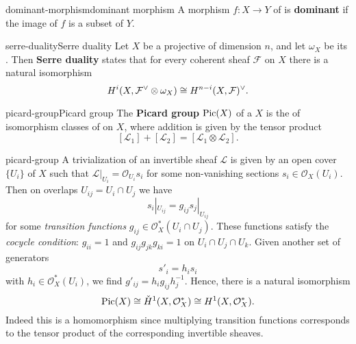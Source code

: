 \begin{topic}{dominant-morphism}{dominant morphism}
    A morphism $f : X \to Y$ of  is \textbf{dominant} if the image of $f$ is a  subset of $Y$.
\end{topic}

\begin{topic}{serre-duality}{Serre duality}
    Let $X$ be a  projective  of dimension $n$, and let $\omega_X$ be its . Then \textbf{Serre duality} states that for every coherent sheaf $\mathcal{F}$ on $X$ there is a natural isomorphism
    \[ H^i(X, \mathcal{F}^\vee \otimes \omega_X) \cong H^{n - i}(X, \mathcal{F})^\vee . \]
\end{topic}

\begin{topic}{picard-group}{Picard group}
    The \textbf{Picard group} $\textup{Pic}(X)$ of a  $X$ is the  of isomorphism classes of  on $X$, where addition is given by the tensor product
    \[ [\mathcal{L}_1] + [\mathcal{L}_2] = [\mathcal{L}_1 \otimes \mathcal{L}_2] . \]
\end{topic}

\begin{example}{picard-group}
    A trivialization of an invertible sheaf $\mathcal{L}$ is given by an open cover $\{ U_i \}$ of $X$ such that $\mathcal{L}|_{U_i} = \mathcal{O}_{U_i} s_i$ for some non-vanishing sections $s_i \in \mathcal{O}_X(U_i)$. Then on overlaps $U_{ij} = U_i \cap U_j$ we have
    \[ s_i|_{U_{ij}} = g_{ij} s_j|_{U_{ij}} \]
    for some \textit{transition functions} $g_{ij} \in \mathcal{O}_X^*(U_i \cap U_j)$. These functions satisfy the \textit{cocycle condition}: $g_{ii} = 1$ and $g_{ij} g_{jk} g_{ki} = 1$ on $U_i \cap U_j \cap U_k$. Given another set of generators
    \[ s'_i = h_i s_i \]
    with $h_i \in \mathcal{O}_X^*(U_i)$, we find $g'_{ij} = h_i g_{ij} h_j^{-1}$. Hence, there is a natural isomorphism
    \[ \textup{Pic}(X) \cong \check{H}^1(X, \mathcal{O}_X^*) \cong H^1(X, \mathcal{O}_X^*) . \]
    Indeed this is a homomorphism since multiplying transition functions corresponds to the tensor product of the corresponding invertible sheaves.
\end{example}

